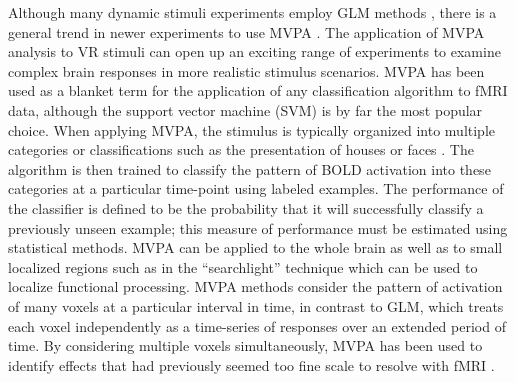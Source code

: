 \documentclass[preprint,5p,authoryear]{elsarticle}
\begin{document}
Although many dynamic stimuli experiments employ GLM methods \citep{Maguire1998,Calhoun2002,King2006,Mathiak2006,Spiers2007a}, there is a general trend in newer experiments to use MVPA \citep{Hassabis2009,Chadwick2010}. The application of MVPA analysis to VR stimuli can open up an exciting range of experiments to examine complex brain responses in more realistic stimulus scenarios.
MVPA has been used as a blanket term for the application of any classification algorithm to fMRI data, although the support vector machine (SVM) is by far the most popular choice.
When applying MVPA, the stimulus is typically organized into multiple categories or classifications such as the presentation of houses or faces \citep{Haxby2001,Mitchell2003,Haynes2006}.
The algorithm is then trained to classify the pattern of BOLD activation into these categories at a particular time-point using labeled examples.
The performance of the classifier is defined to be the probability that it will successfully classify a previously unseen example;
this measure of performance must be estimated using statistical methods.
MVPA can be applied to the whole brain as well as to small localized regions such as in the ``searchlight'' technique \citep{Kriegeskorte2006} which can be used to localize functional processing.
MVPA methods consider the pattern of activation of many voxels at a particular interval in time, in contrast to GLM, which treats each voxel independently as a time-series of responses over an extended period of time.
By considering multiple voxels simultaneously, MVPA has been used to identify effects that had previously seemed too fine scale to resolve with fMRI \citep{Kamitani2005,Hassabis2009}.
\end{document}
